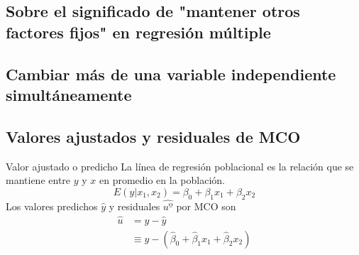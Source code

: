 \subsection{Sobre el significado de "mantener otros factores fijos" en regresión múltiple}

\subsection{Cambiar más de una variable independiente simultáneamente}

\subsection{Valores ajustados y residuales de MCO}
\begin{frame}{Valor ajustado o predicho}
	La línea de regresión poblacional es la relación que se mantiene entre $y$ y $x$ en promedio en la población.
	$$E(y|x_{1}, x_{2}) = \beta_{0}+\beta_{1}x_1+\beta_{2}x_2$$
	Los valores predichos $\widehat{y}$ y residuales $\widehat{uº}$ por MCO son
	\begin{align*}
		\hat{u} & = y - \hat{y}\\
		& \equiv y - (\hat{\beta}_{0}+\hat{\beta}_{1}x_{1}+\hat{\beta}_{2}x_{2})
	\end{align*}
\end{frame}


